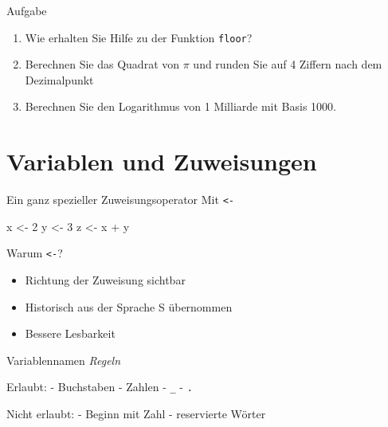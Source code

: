 \documentclass[
  10pt,
  ignorenonframetext,
  aspectratio=169,
]{beamer}
\newenvironment{Shaded}{}{}
\newcommand{\DecValTok}[1]{\textcolor[rgb]{0.25,0.63,0.44}{#1}}
\newcommand{\NormalTok}[1]{#1}
\newcommand{\OtherTok}[1]{\textcolor[rgb]{0.00,0.44,0.13}{#1}}
\newcommand{\SpecialCharTok}[1]{\textcolor[rgb]{0.25,0.44,0.63}{#1}}
\providecommand{\tightlist}{%
  \setlength{\itemsep}{0pt}\setlength{\parskip}{0pt}}
\begin{document}
\begin{frame}[fragile]{Aufgabe}
\label{aufgabe-1}
\begin{enumerate}
\tightlist
\item
  Wie erhalten Sie Hilfe zu der Funktion \texttt{floor}?
\item
  Berechnen Sie das Quadrat von \(\pi\) und runden Sie auf 4 Ziffern
  nach dem Dezimalpunkt
\item
  Berechnen Sie den Logarithmus von 1 Milliarde mit Basis 1000.
\end{enumerate}
\end{frame}

\begin{frame}
\end{frame}

\section{Variablen und Zuweisungen}\label{variablen-und-zuweisungen}

\begin{frame}[fragile]{Ein ganz spezieller Zuweisungsoperator}
\label{ein-ganz-spezieller-zuweisungsoperator}
Mit \texttt{\textless{}-}

\begin{Shaded}
\begin{Highlighting}[]
\NormalTok{x }\OtherTok{\textless{}{-}} \DecValTok{2}
\NormalTok{y }\OtherTok{\textless{}{-}} \DecValTok{3}
\NormalTok{z }\OtherTok{\textless{}{-}}\NormalTok{ x }\SpecialCharTok{+}\NormalTok{ y}
\end{Highlighting}
\end{Shaded}
\end{frame}

\begin{frame}{Warum \texttt{\textless{}-}?}
\label{warum--}
\begin{itemize}
\tightlist
\item
  Richtung der Zuweisung sichtbar
\item
  Historisch aus der Sprache S übernommen
\item
  Bessere Lesbarkeit
\end{itemize}
\end{frame}

\begin{frame}[fragile]{Variablennamen}
\label{variablennamen}
\emph{Regeln}

Erlaubt: - Buchstaben - Zahlen - \texttt{\_} - \texttt{.}

Nicht erlaubt: - Beginn mit Zahl - reservierte Wörter
\end{frame}
\end{document}
